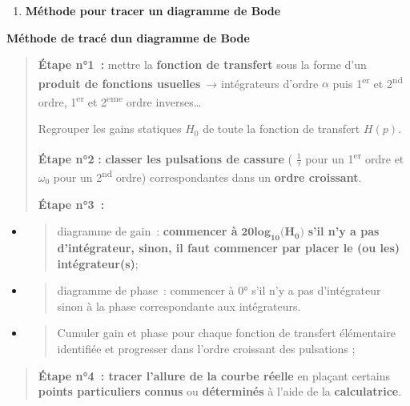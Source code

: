 \begin{enumerate}
\def\labelenumi{\arabic{enumi}.}
\setcounter{enumi}{7}
\item
  \protect\hypertarget{mod-_Toc99121133}{}{}\textbf{Méthode pour tracer un diagramme de Bode}
\end{enumerate}

\textbf{Méthode de tracé d\textquotesingle un diagramme de Bode}

\begin{quote}
\textbf{Étape n°1~:} mettre la \textbf{fonction de transfert} sous la forme d'un \textbf{produit de fonctions usuelles}~→ intégrateurs d'ordre \(\alpha\) puis 1\textsuperscript{er} et 2\textsuperscript{nd} ordre, 1\textsuperscript{er} et 2\textsuperscript{eme} ordre inverses\ldots{}

Regrouper les gains statiques \(H_{0}\) de toute la fonction de transfert \(H(p)\).

\textbf{Étape n°2} \textbf{:} \textbf{classer les pulsations de cassure} ( \(\frac{1}{\tau}\) pour un 1\textsuperscript{er} ordre et \(\omega_{0}\) pour un 2\textsuperscript{nd} ordre) correspondantes dans un \textbf{ordre croissant}.

\textbf{Étape n°3~:}
\end{quote}

\begin{itemize}
\item
  \begin{quote}
  diagramme de gain~: \textbf{commencer à} \(\mathbf{20}\mathbf{lo}\mathbf{g}_{\mathbf{10}}\mathbf{(}\mathbf{H}_{\mathbf{0}}\mathbf{)}\) \textbf{s'il n'y a pas d'intégrateur, sinon, il faut commencer par placer le (ou les) intégrateur(s)};
  \end{quote}
\item
  \begin{quote}
  diagramme de phase~: commencer à 0° s'il n'y a pas d'intégrateur sinon à la phase correspondante aux intégrateurs.
  \end{quote}
\item
  \begin{quote}
  Cumuler gain et phase pour chaque fonction de transfert élémentaire identifiée et progresser dans l'ordre croissant des pulsations ;
  \end{quote}
\end{itemize}

\begin{quote}
\textbf{Étape n°4~: tracer l'allure de la courbe réelle} en plaçant certains \textbf{points particuliers} \textbf{connus} ou \textbf{déterminés} à l'aide de la \textbf{calculatrice}.
\end{quote}

